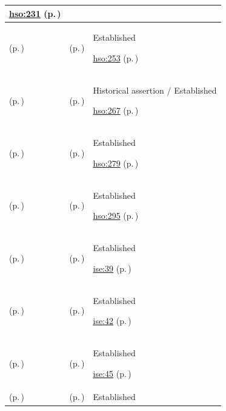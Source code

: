 \begin{longtable}{|>{\raggedright\arraybackslash}p{0.27\TableWidth}|>{\raggedright\arraybackslash}p{0.27\TableWidth}|>{\raggedright\arraybackslash}p{0.46\TableWidth}|}
 \hyperref[rad:hso:221]{hso:231} (p.\,\pageref{rad:hso:221})\\\hline
\nameref{function:manage-patient-transport-progression} (p.\,\pageref{function:manage-patient-transport-progression}) & \nameref{feature:feat-hso-25} (p.\,\pageref{feature:feat-hso-25}) & Established

 \hyperref[rad:hso:250]{hso:253} (p.\,\pageref{rad:hso:250})\\\hline
\nameref{function:manage-specimen-transport-progression} (p.\,\pageref{function:manage-specimen-transport-progression}) & \nameref{feature:feat-hso-26} (p.\,\pageref{feature:feat-hso-26}) & Historical assertion / Established

 \hyperref[rad:hso:264]{hso:267} (p.\,\pageref{rad:hso:264})\\\hline
\nameref{function:manage-discharge-coordination-progression} (p.\,\pageref{function:manage-discharge-coordination-progression}) & \nameref{feature:feat-hso-28} (p.\,\pageref{feature:feat-hso-28}) & Established

 \hyperref[rad:hso:275]{hso:279} (p.\,\pageref{rad:hso:275})\\\hline
\nameref{function:verify-clinical-qualification-for-work-dispatch} (p.\,\pageref{function:verify-clinical-qualification-for-work-dispatch}) & \nameref{feature:feat-hso-23} (p.\,\pageref{feature:feat-hso-23}) & Established

 \hyperref[rad:hso:292]{hso:295} (p.\,\pageref{rad:hso:292})\\\hline
\nameref{function:assemble-longitudinal-clinical-record} (p.\,\pageref{function:assemble-longitudinal-clinical-record}) & \nameref{feature:feat-ise-01} (p.\,\pageref{feature:feat-ise-01}) & Established

 \hyperref[rad:ise:35]{ise:39} (p.\,\pageref{rad:ise:35})\\\hline
\nameref{function:maintain-active-clinical-record} (p.\,\pageref{function:maintain-active-clinical-record}) & \nameref{feature:feat-ise-02} (p.\,\pageref{feature:feat-ise-02}) & Established

 \hyperref[rad:ise:35]{ise:42} (p.\,\pageref{rad:ise:35})\\\hline
\nameref{function:preserve-durable-clinical-record} (p.\,\pageref{function:preserve-durable-clinical-record}) & \nameref{feature:feat-ise-03} (p.\,\pageref{feature:feat-ise-03}) & Established

 \hyperref[rad:ise:35]{ise:45} (p.\,\pageref{rad:ise:35})\\\hline
\nameref{function:receive-information-submission} (p.\,\pageref{function:receive-information-submission}) & \nameref{feature:feat-ise-04} (p.\,\pageref{feature:feat-ise-04}) & Established


\end{longtable}
